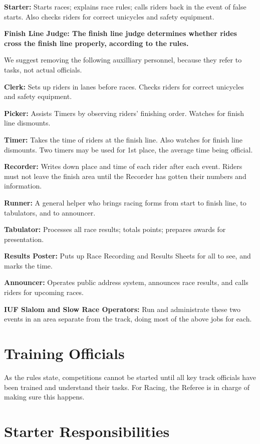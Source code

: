 \textbf{Starter:} Starts races; explains race rules; calls riders back in the event of false starts.
Also checks riders for correct unicycles and safety equipment.

\textbf{Finish Line Judge: The finish line judge determines whether rides cross the finish line properly, according to the rules.}

\begin{framed}
We suggest removing the following auxilliary personnel, because they refer to tasks, 
not actual officials.
\end{framed}

\textbf{Clerk:} Sets up riders in lanes before races.
Checks riders for correct unicycles and safety equipment.

\textbf{Picker:} Assists Timers by observing riders' finishing order.
Watches for finish line dismounts.

\textbf{Timer:} Takes the time of riders at the finish line.
Also watches for finish line dismounts.
Two timers may be used for 1st place, the average time being official.

\textbf{Recorder:} Writes down place and time of each rider after each event.
Riders must not leave the finish area until the Recorder has gotten their numbers and information.

\textbf{Runner:} A general helper who brings racing forms from start to finish line, to tabulators, and to announcer.

\textbf{Tabulator:} Processes all race results; totals points; prepares awards for presentation.

\textbf{Results Poster:} Puts up Race Recording and Results Sheets for all to see, and marks the time.

\textbf{Announcer:} Operates public address system, announces race results, and calls riders for upcoming races.

\textbf{IUF Slalom and Slow Race Operators:} Run and administrate these two events in an area separate from the track, doing most of the above jobs for each.

\section{Training Officials}
As the rules state, competitions cannot be started until all key track officials have been trained and understand their tasks.
For Racing, the Referee is in charge of making sure this happens.

\section{Starter Responsibilities\label{sec:track_starter}}

